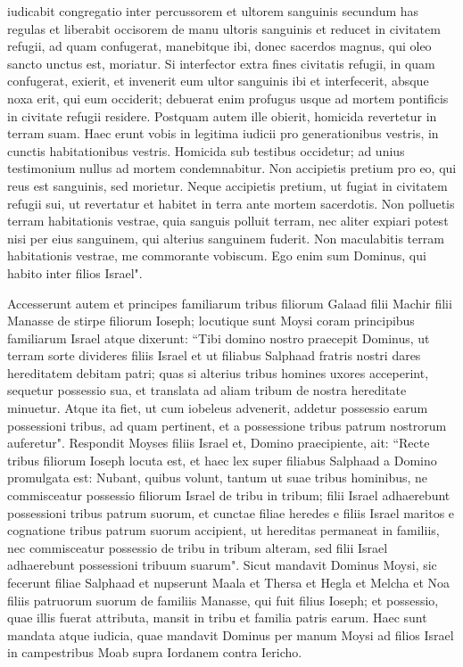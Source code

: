 \begin{biblechapter}
\verse iudicabit congregatio inter percussorem et ultorem sanguinis secundum has regulas 
\verse et liberabit occisorem de manu ultoris sanguinis et reducet in civitatem refugii, ad quam confugerat, manebitque ibi, donec sacerdos magnus, qui oleo sancto unctus est, moriatur. 
\verse Si interfector extra fines civitatis refugii, in quam confugerat, exierit, 
\verse et invenerit eum ultor sanguinis ibi et interfecerit, absque noxa erit, qui eum occiderit; 
\verse debuerat enim profugus usque ad mortem pontificis in civitate refugii residere. Postquam autem ille obierit, homicida revertetur in terram suam. 
\verse Haec erunt vobis in legitima iudicii pro generationibus vestris, in cunctis habitationibus vestris. 
\verse Homicida sub testibus occidetur; ad unius testimonium nullus ad mortem condemnabitur. 
\verse Non accipietis pretium pro eo, qui reus est sanguinis, sed morietur. 
\verse Neque accipietis pretium, ut fugiat in civitatem refugii sui, ut revertatur et habitet in terra ante mortem sacerdotis. 
\verse Non polluetis terram habitationis vestrae, quia sanguis polluit terram, nec aliter expiari potest nisi per eius sanguinem, qui alterius sanguinem fuderit. 
\verse Non maculabitis terram habitationis vestrae, me commorante vobiscum. Ego enim sum Dominus, qui habito inter filios Israel". 
\end{biblechapter}

\begin{biblechapter}  
\verse Accesserunt autem et principes familiarum tribus filiorum Galaad filii Machir filii Manasse de stirpe filiorum Ioseph; locutique sunt Moysi coram principibus familiarum Israel 
\verse atque dixerunt: “Tibi domino nostro praecepit Dominus, ut terram sorte divideres filiis Israel et ut filiabus Salphaad fratris nostri dares hereditatem debitam patri; 
\verse quas si alterius tribus homines uxores acceperint, sequetur possessio sua, et translata ad aliam tribum de nostra hereditate minuetur. 
\verse Atque ita fiet, ut cum iobeleus advenerit, addetur possessio earum possessioni tribus, ad quam pertinent, et a possessione tribus patrum nostrorum auferetur". 
\verse Respondit Moyses filiis Israel et, Domino praecipiente, ait: “Recte tribus filiorum Ioseph locuta est, 
\verse et haec lex super filiabus Salphaad a Domino promulgata est: Nubant, quibus volunt, tantum ut suae tribus hominibus, 
\verse ne commisceatur possessio filiorum Israel de tribu in tribum; filii Israel adhaerebunt possessioni tribus patrum suorum, 
\verse et cunctae filiae heredes e filiis Israel maritos e cognatione tribus patrum suorum accipient, ut hereditas permaneat in familiis, 
\verse nec commisceatur possessio de tribu in tribum alteram, sed filii Israel adhaerebunt possessioni tribuum suarum". 
\verse Sicut mandavit Dominus Moysi, sic fecerunt filiae Salphaad 
\verse et nupserunt Maala et Thersa et Hegla et Melcha et Noa filiis patruorum suorum  
\verse de familiis Manasse, qui fuit filius Ioseph; et possessio, quae illis fuerat attributa, mansit in tribu et familia patris earum. 
\verse Haec sunt mandata atque iudicia, quae mandavit Dominus per manum Moysi ad filios Israel in campestribus Moab supra Iordanem contra Iericho.
\end{biblechapter}

